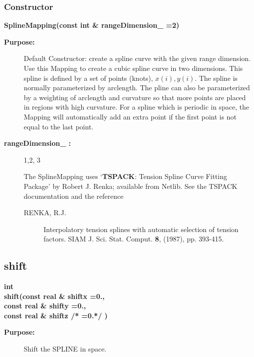 \subsubsection{Constructor}
 
\newlength{\SplineMappingIncludeArgIndent}
\begin{flushleft} \textbf{%
\settowidth{\SplineMappingIncludeArgIndent}{SplineMapping(}%
SplineMapping(const int \& rangeDimension\_  =2) 
}\end{flushleft}
\begin{description}
\item[{\bf Purpose:}] 
    Default Constructor: create a spline curve with the given range dimension.
 Use this Mapping to create a cubic spline curve in two dimensions.
 This spline is defined by a set of points (knots), $x(i),y(i)$.
 The spline is normally parameterized by arclength. The pline can also be parameterized
 by a weighting of arclength and curvature so that more points are placed in regions
 with high curvature.
 For a spline which is periodic in space, the Mapping will automatically
 add an extra point if the first point is not equal to the last point.

\item[{\bf rangeDimension\_ :}]  1,2, 3

 The SplineMapping uses `{\bf TSPACK}: Tension Spline Curve Fitting Package'
 by Robert J. Renka; available from Netlib. See the TSPACK documentation
 and the reference 
 \begin{description}
   \item[RENKA, R.J.] Interpolatory tension splines with automatic selection
   of tension factors. SIAM J. Sci. Stat. Comput. {\bf 8}, (1987), pp. 393-415.
 \end{description}

\end{description}
\subsection{shift}
 
\begin{flushleft} \textbf{%
int  \\ 
\settowidth{\SplineMappingIncludeArgIndent}{shift(}%
shift(const real \& shiftx  =0., \\ 
\hspace{\SplineMappingIncludeArgIndent}const real \& shifty  =0., \\ 
\hspace{\SplineMappingIncludeArgIndent}const real \& shiftz /* =0.*/ )
}\end{flushleft}
\begin{description}
\item[{\bf Purpose:}]  Shift the SPLINE in space.
\end{description}
